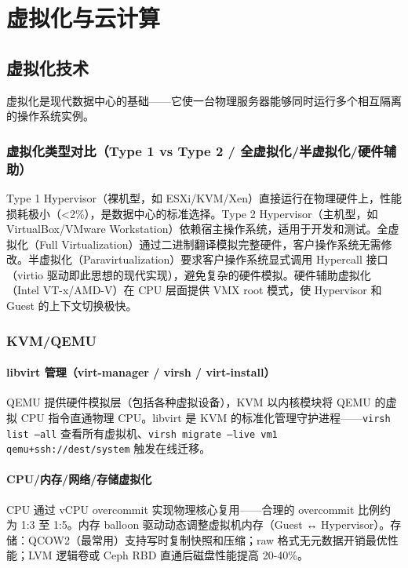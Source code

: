 \documentclass[12pt,UTF8]{ctexbook}
\begin{document}
\part{虚拟化与云计算}

\chapter{虚拟化技术}
\label{chap:virtualization}

虚拟化是现代数据中心的基础——它使一台物理服务器能够同时运行多个相互隔离的操作系统实例。

  \section{虚拟化类型对比（Type 1 vs Type 2 / 全虚拟化/半虚拟化/硬件辅助）}

Type 1 Hypervisor（裸机型，如 ESXi/KVM/Xen）直接运行在物理硬件上，性能损耗极小（<2\%），是数据中心的标准选择。Type 2 Hypervisor（主机型，如 VirtualBox/VMware Workstation）依赖宿主操作系统，适用于开发和测试。全虚拟化（Full Virtualization）通过二进制翻译模拟完整硬件，客户操作系统无需修改。半虚拟化（Paravirtualization）要求客户操作系统显式调用 Hypercall 接口（virtio 驱动即此思想的现代实现），避免复杂的硬件模拟。硬件辅助虚拟化（Intel VT-x/AMD-V）在 CPU 层面提供 VMX root 模式，使 Hypervisor 和 Guest 的上下文切换极快。

  \section{KVM/QEMU}
    \subsection{libvirt 管理（virt-manager / virsh / virt-install）}

QEMU 提供硬件模拟层（包括各种虚拟设备），KVM 以内核模块将 QEMU 的虚拟 CPU 指令直通物理 CPU。libvirt 是 KVM 的标准化管理守护进程——\texttt{virsh list --all} 查看所有虚拟机、\texttt{virsh migrate --live vm1 qemu+ssh://dest/system} 触发在线迁移。

    \subsection{CPU/内存/网络/存储虚拟化}

CPU 通过 vCPU overcommit 实现物理核心复用——合理的 overcommit 比例约为 1:3 至 1:5。内存 balloon 驱动动态调整虚拟机内存（Guest ↔ Hypervisor）。存储：QCOW2（最常用）支持写时复制快照和压缩；raw 格式无元数据开销最优性能；LVM 逻辑卷或 Ceph RBD 直通后磁盘性能提高 20-40\%。
\end{document}
